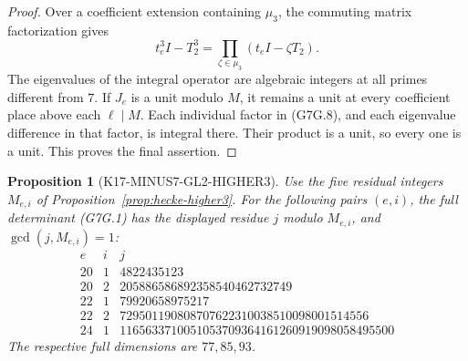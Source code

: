 \documentclass[11pt,a4paper]{article}
\newtheorem{proposition}[theorem]{Proposition}
\theoremstyle{definition}
\begin{document}
\begin{proof}
Over a coefficient extension containing \(\mu_3\), the commuting
matrix factorization gives
\[
 t_e^3I-T_2^3=\prod_{\zeta\in\mu_3}(t_eI-\zeta T_2).
 \tag{G7G.8}
\]
The eigenvalues of the integral operator are algebraic integers
at all primes different from \(7\). If \(J_e\) is a unit modulo
\(M\), it remains a unit at every coefficient place above
each \(\ell\mid M\). Each individual factor in (G7G.8), and
each eigenvalue difference in that factor, is integral there.
Their product is a unit, so every one is a unit. This proves
the final assertion.
\end{proof}

\begin{proposition}[K17-MINUS7-GL2-HIGHER3]
\label{prop:minus7-gl2-higher3}
Use the five residual integers \(M_{e,i}\) of
Proposition~\ref{prop:hecke-higher3}.
For the following pairs \((e,i)\), the full determinant (G7G.1)
has the displayed residue \(j\) modulo \(M_{e,i}\), and
\(\gcd(j,M_{e,i})=1\):
\[
\begin{array}{c|c|r}
e&i&j\\ \hline
20&1&4822435123\\
20&2&205886586892358540462732749\\
22&1&79920658975217\\
22&2&729501190808707622310038510098001514556\\
24&1&1165633710051053709364161260919098058495500
\end{array}
\tag{G7G.9}
\]
The respective full dimensions are \(77,85,93\).
\end{proposition}
\end{document}
